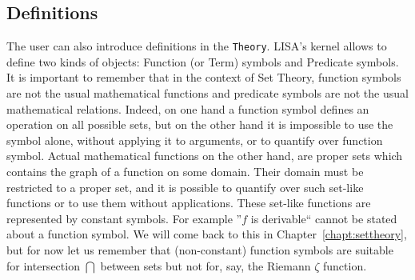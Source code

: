 \subsection{Definitions}
\label{subs:definitions}
The user can also introduce definitions in the \lstinline{Theory}{}. 
LISA's kernel allows to define two kinds of objects: Function (or Term) symbols and Predicate symbols. It is important to remember that in the context of Set Theory, function symbols are not the usual mathematical functions and predicate symbols are not the usual mathematical relations. Indeed, on one hand a function symbol defines an operation on all possible sets, but on the other hand it is impossible to use the symbol alone, without applying it to arguments, or to quantify over function symbol.
Actual mathematical functions on the other hand, are proper sets which contains the graph of a function on some domain. Their domain must be restricted to a proper set, and it is possible to quantify over such set-like functions or to use them without applications. These set-like functions are represented by constant symbols.  For example ''$f$ is derivable`` cannot be stated about a function symbol. We will come back to this in Chapter~\ref{chapt:settheory}, but for now let us remember that (non-constant) function symbols are suitable for intersection $\bigcap$ between sets but not for, say, the Riemann $\zeta$ function.

